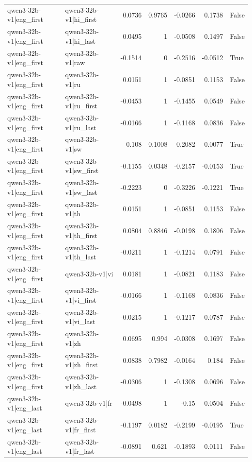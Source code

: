 \begin{table}
\begin{tabular}{l l r r r r l}
qwen3-32b-v1|eng_first & qwen3-32b-v1|hi_first & 0.0736 & 0.9765 & -0.0266 & 0.1738 & False \\
qwen3-32b-v1|eng_first & qwen3-32b-v1|hi_last & 0.0495 & 1 & -0.0508 & 0.1497 & False \\
qwen3-32b-v1|eng_first & qwen3-32b-v1|raw & -0.1514 & 0 & -0.2516 & -0.0512 & True \\
qwen3-32b-v1|eng_first & qwen3-32b-v1|ru & 0.0151 & 1 & -0.0851 & 0.1153 & False \\
qwen3-32b-v1|eng_first & qwen3-32b-v1|ru_first & -0.0453 & 1 & -0.1455 & 0.0549 & False \\
qwen3-32b-v1|eng_first & qwen3-32b-v1|ru_last & -0.0166 & 1 & -0.1168 & 0.0836 & False \\
qwen3-32b-v1|eng_first & qwen3-32b-v1|sw & -0.108 & 0.1008 & -0.2082 & -0.0077 & True \\
qwen3-32b-v1|eng_first & qwen3-32b-v1|sw_first & -0.1155 & 0.0348 & -0.2157 & -0.0153 & True \\
qwen3-32b-v1|eng_first & qwen3-32b-v1|sw_last & -0.2223 & 0 & -0.3226 & -0.1221 & True \\
qwen3-32b-v1|eng_first & qwen3-32b-v1|th & 0.0151 & 1 & -0.0851 & 0.1153 & False \\
qwen3-32b-v1|eng_first & qwen3-32b-v1|th_first & 0.0804 & 0.8846 & -0.0198 & 0.1806 & False \\
qwen3-32b-v1|eng_first & qwen3-32b-v1|th_last & -0.0211 & 1 & -0.1214 & 0.0791 & False \\
qwen3-32b-v1|eng_first & qwen3-32b-v1|vi & 0.0181 & 1 & -0.0821 & 0.1183 & False \\
qwen3-32b-v1|eng_first & qwen3-32b-v1|vi_first & -0.0166 & 1 & -0.1168 & 0.0836 & False \\
qwen3-32b-v1|eng_first & qwen3-32b-v1|vi_last & -0.0215 & 1 & -0.1217 & 0.0787 & False \\
qwen3-32b-v1|eng_first & qwen3-32b-v1|zh & 0.0695 & 0.994 & -0.0308 & 0.1697 & False \\
qwen3-32b-v1|eng_first & qwen3-32b-v1|zh_first & 0.0838 & 0.7982 & -0.0164 & 0.184 & False \\
qwen3-32b-v1|eng_first & qwen3-32b-v1|zh_last & -0.0306 & 1 & -0.1308 & 0.0696 & False \\
qwen3-32b-v1|eng_last & qwen3-32b-v1|fr & -0.0498 & 1 & -0.15 & 0.0504 & False \\
qwen3-32b-v1|eng_last & qwen3-32b-v1|fr_first & -0.1197 & 0.0182 & -0.2199 & -0.0195 & True \\
qwen3-32b-v1|eng_last & qwen3-32b-v1|fr_last & -0.0891 & 0.621 & -0.1893 & 0.0111 & False \\

\end{tabular}
\end{table}
